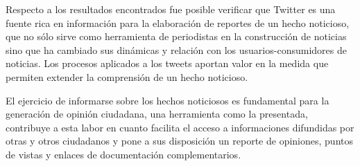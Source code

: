 Respecto a los resultados encontrados fue posible verificar que Twitter es una fuente rica en información para la elaboración de reportes de un hecho noticioso, que no sólo sirve como herramienta de periodistas en la construcción de noticias sino que ha cambiado sus dinámicas y relación con los usuarios-consumidores de noticias. Los procesos aplicados a los tweets aportan valor en la medida que permiten extender la comprensión de un hecho noticioso.

El ejercicio de informarse sobre los hechos noticiosos es fundamental para la generación de opinión ciudadana, una herramienta como la presentada, contribuye a esta labor en cuanto facilita el acceso a informaciones difundidas por otras y otros ciudadanos y pone a sus disposición un reporte de opiniones, puntos de vistas y enlaces de documentación complementarios. 




